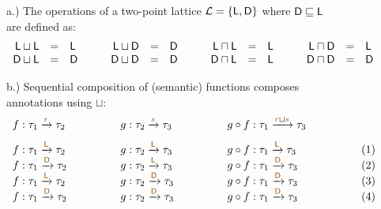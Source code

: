\begin{figure}
{\small a.) The operations of a two-point lattice $\mathcal{L} = \{\ident{L}, \ident{D}\}$ 
where $\textnormal{\sffamily D} \sqsubseteq \textnormal{\sffamily L}$ are defined as:}
%
\begin{equation*}
\begin{array}{rcl}
\textnormal{\sffamily L} \sqcup \textnormal{\sffamily L} &=& \textnormal{\sffamily L}\\
\textnormal{\sffamily D} \sqcup \textnormal{\sffamily L} &=& \textnormal{\sffamily D}\\
\end{array}
\qquad
\begin{array}{rcl}
\textnormal{\sffamily L} \sqcup \textnormal{\sffamily D} &=& \textnormal{\sffamily D}\\
\textnormal{\sffamily D} \sqcup \textnormal{\sffamily D} &=& \textnormal{\sffamily D}
\end{array}
\qquad
\begin{array}{rcl}
\textnormal{\sffamily L} \sqcap \textnormal{\sffamily L} &=& \textnormal{\sffamily L}\\
\textnormal{\sffamily D} \sqcap \textnormal{\sffamily L} &=& \textnormal{\sffamily L}\\
\end{array}
\qquad
\begin{array}{rcl}
\textnormal{\sffamily L} \sqcap \textnormal{\sffamily D} &=& \textnormal{\sffamily L}\\
\textnormal{\sffamily D} \sqcap \textnormal{\sffamily D} &=& \textnormal{\sffamily D}
\end{array}
\end{equation*}

{\small b.) Sequential composition of (semantic) functions composes annotations using $\sqcup$:}
\begin{equation*}
\begin{array}{llll}
f : \tau_1 \xrightarrow{\aclrd{r}} \tau_2 \qquad\qquad&
g : \tau_2 \xrightarrow{\aclrd{s}} \tau_3 \qquad\qquad&
g \circ f : \tau_1 \xrightarrow{\aclrd{r} \sqcup \aclrd{s}} \tau_3 \qquad\qquad& ~
\\[0.75em]
f : \tau_1 \xrightarrow{\aclrd{\ident{L}}} \tau_2 &
g : \tau_2 \xrightarrow{\aclrd{\ident{L}}} \tau_3 &
g \circ f : \tau_1 \xrightarrow{\aclrd{ \ident{L} }} \tau_3 & (1)
\\[-0.10em]
f : \tau_1 \xrightarrow{\aclrd{\ident{D}}} \tau_2 &
g : \tau_2 \xrightarrow{\aclrd{\ident{L}}} \tau_3 &
g \circ f : \tau_1 \xrightarrow{\aclrd{ \ident{D} }} \tau_3 & (2)
\\[-0.10em]
f : \tau_1 \xrightarrow{\aclrd{\ident{L}}} \tau_2 &
g : \tau_2 \xrightarrow{\aclrd{\ident{D}}} \tau_3 &
g \circ f : \tau_1 \xrightarrow{\aclrd{ \ident{D} }} \tau_3 & (3)
\\[-0.10em]
f : \tau_1 \xrightarrow{\aclrd{\ident{D}}} \tau_2 &
g : \tau_2 \xrightarrow{\aclrd{\ident{D}}} \tau_3 &
g \circ f : \tau_1 \xrightarrow{\aclrd{ \ident{D} }} \tau_3 & (4)
\end{array}
\end{equation*}


\end{figure}
